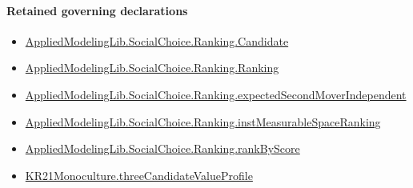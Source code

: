 \documentclass[10pt]{article}
\begin{document}
\paragraph{Retained governing declarations}
\begin{itemize}\raggedright
\item \hyperlink{library-prerequisite-8c0e6c25845ae78a}{Applied\allowbreak{}Modeling\allowbreak{}Lib.\allowbreak{}Social\allowbreak{}Choice.\allowbreak{}Ranking.\allowbreak{}Candidate}
\item \hyperlink{library-prerequisite-5cde54446d1ae021}{Applied\allowbreak{}Modeling\allowbreak{}Lib.\allowbreak{}Social\allowbreak{}Choice.\allowbreak{}Ranking.\allowbreak{}Ranking}
\item \hyperlink{governing-declaration-4f697449f42135d1}{Applied\allowbreak{}Modeling\allowbreak{}Lib.\allowbreak{}Social\allowbreak{}Choice.\allowbreak{}Ranking.\allowbreak{}expected\allowbreak{}Second\allowbreak{}Mover\allowbreak{}Independent}
\item \hyperlink{governing-declaration-30ca9c740ef703ec}{Applied\allowbreak{}Modeling\allowbreak{}Lib.\allowbreak{}Social\allowbreak{}Choice.\allowbreak{}Ranking.\allowbreak{}inst\allowbreak{}Measurable\allowbreak{}Space\allowbreak{}Ranking}
\item \hyperlink{governing-declaration-c2e98278351275b0}{Applied\allowbreak{}Modeling\allowbreak{}Lib.\allowbreak{}Social\allowbreak{}Choice.\allowbreak{}Ranking.\allowbreak{}rank\allowbreak{}By\allowbreak{}Score}
\item \hyperlink{governing-declaration-bcbc7730fd1aad6d}{KR21\allowbreak{}Monoculture.\allowbreak{}three\allowbreak{}Candidate\allowbreak{}Value\allowbreak{}Profile}
\end{itemize}
\end{document}
